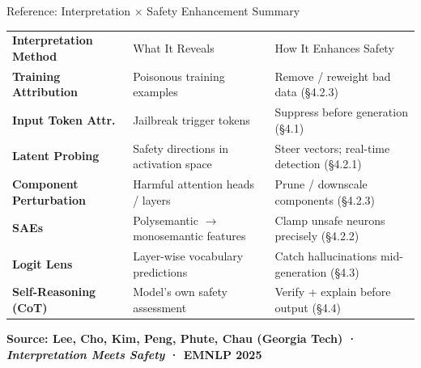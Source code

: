 \begin{frame}{Reference: Interpretation × Safety Enhancement Summary}
  \vspace*{0.1cm}
  \small
  \setlength{\tabcolsep}{4pt}
  \renewcommand{\arraystretch}{1.45}
  \begin{tabularx}{\textwidth}{>{\bfseries\scriptsize\color{UCRnavy}}l >{\scriptsize}X >{\scriptsize}X}
    \rowcolor{UCRnavy}
    \color{white}Interpretation Method &
    \color{white}What It Reveals &
    \color{white}How It Enhances Safety \\
    \rowcolor{UCRlgray}
    Training Attribution & Poisonous training examples & Remove / reweight bad data (\S4.2.3) \\
    Input Token Attr. & Jailbreak trigger tokens & Suppress before generation (\S4.1) \\
    \rowcolor{UCRlgray}
    Latent Probing & Safety directions in activation space & Steer vectors; real-time detection (\S4.2.1) \\
    Component Perturbation & Harmful attention heads / layers & Prune / downscale components (\S4.2.3) \\
    \rowcolor{UCRlgray}
    SAEs & Polysemantic $\to$ monosemantic features & Clamp unsafe neurons precisely (\S4.2.2) \\
    Logit Lens & Layer-wise vocabulary predictions & Catch hallucinations mid-generation (\S4.3) \\
    \rowcolor{UCRlgray}
    Self-Reasoning (CoT) & Model's own safety assessment & Verify + explain before output (\S4.4) \\
  \end{tabularx}
  \vspace{0.4em}
  \begin{ucrinfo}
    \centering\scriptsize\bfseries
    Source: Lee, Cho, Kim, Peng, Phute, Chau (Georgia Tech) ·
    \textit{Interpretation Meets Safety} · EMNLP 2025
  \end{ucrinfo}
\end{frame}

